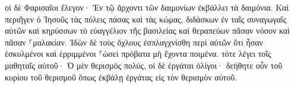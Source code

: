 \documentclass{openreader}
\begin{document}
οἱ δὲ Φαρισαῖοι ἔλεγον· Ἐν τῷ ἄρχοντι τῶν δαιμονίων ἐκβάλλει τὰ δαιμόνια. 
Καὶ περιῆγεν ὁ Ἰησοῦς τὰς πόλεις πάσας καὶ τὰς κώμας, διδάσκων ἐν ταῖς συναγωγαῖς αὐτῶν καὶ κηρύσσων τὸ εὐαγγέλιον τῆς βασιλείας καὶ θεραπεύων πᾶσαν νόσον καὶ πᾶσαν ⸀μαλακίαν. 
Ἰδὼν δὲ τοὺς ὄχλους ἐσπλαγχνίσθη περὶ αὐτῶν ὅτι ἦσαν ἐσκυλμένοι καὶ ἐρριμμένοι ⸀ὡσεὶ πρόβατα μὴ ἔχοντα ποιμένα. 
τότε λέγει τοῖς μαθηταῖς αὐτοῦ· Ὁ μὲν θερισμὸς πολύς, οἱ δὲ ἐργάται ὀλίγοι· 
δεήθητε οὖν τοῦ κυρίου τοῦ θερισμοῦ ὅπως ἐκβάλῃ ἐργάτας εἰς τὸν θερισμὸν αὐτοῦ. 
\end{document}
